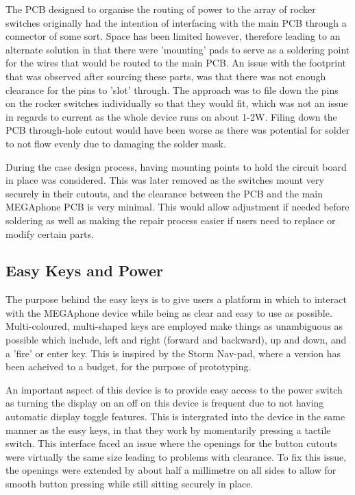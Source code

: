 The PCB designed to organise the routing of power to the array of rocker switches originally had the intention of interfacing with the main PCB through a connector of some sort.
Space has been limited however, therefore leading to an alternate solution in that there were 'mounting' pads to serve as a soldering point for the wires that would be routed to the main PCB.
An issue with the footprint that was observed after sourcing these parts, was that there was not enough clearance for the pins to 'slot' through.
The approach was to file down the pins on the rocker switches individually so that they would fit, which was not an issue in regards to current as the whole device runs on about 1-2W.
Filing down the PCB through-hole cutout would have been worse as there was potential for solder to not flow evenly due to damaging the solder mask. %

During the case design process, having mounting points to hold the circuit board in place was considered.
This was later removed as the switches mount very securely in their cutouts, and the clearance between the PCB and the main MEGAphone PCB is very minimal.
This would allow adjustment if needed before soldering as well as making the repair process easier if users need to replace or modify certain parts.


\subsection{Easy Keys and Power}

The purpose behind the easy keys is to give users a platform in which to interact with the MEGAphone device while being as clear and easy to use as possible.
Multi-coloured, multi-shaped keys are employed make things as unambiguous as possible which include, left and right (forward and backward), up and down, and a 'fire' or enter key.
This is inspired by the Storm Nav-pad, where a version has been acheived to a budget, for the purpose of prototyping.

An important aspect of this device is to provide easy access to the power switch as turning the display on an off on this device is frequent due to not having automatic display toggle features.
This is intergrated into the device in the same manner as the easy keys, in that they work by momentarily pressing a tactile switch.
This interface faced an issue where the openings for the button cutouts were virtually the same size leading to problems with clearance. 
To fix this issue, the openings were extended by about half a millimetre on all sides to allow for smooth button pressing while still sitting securely in place.

